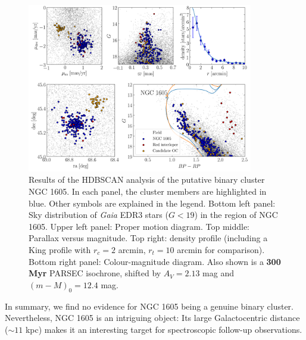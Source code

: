 \documentclass[RNAAS]{aastex631}
\begin{document}
\begin{figure}
\begin{center}
\includegraphics[width=0.88\textwidth,angle=0]{im/ngc1605_hdbscan_analysis.png}
\caption{Results of the HDBSCAN analysis of the putative binary cluster NGC 1605. In each panel, the cluster members are highlighted in blue. Other symbols are explained in the legend. Bottom left panel: Sky distribution of {\it Gaia} EDR3 stars ($G<19$) in the region of NGC 1605. Upper left panel: Proper motion diagram. Top middle: Parallax versus magnitude. Top right: density profile (including a King profile with $r_c=2$ arcmin, $r_t=10$ arcmin for comparison). Bottom right panel: Colour-magnitude diagram. Also shown is a {\bf 300 Myr} PARSEC isochrone, shifted by $A_V=2.13$ mag and $(m-M)_0=12.4$ mag. \label{fig:1}}
\end{center}
\end{figure}

In summary, we find no evidence for NGC 1605 being a genuine binary cluster. Nevertheless, NGC 1605 is an intriguing object: Its large Galactocentric distance ($\sim 11$ kpc) makes it an interesting target for spectroscopic follow-up observations. 


{}

\end{document}
